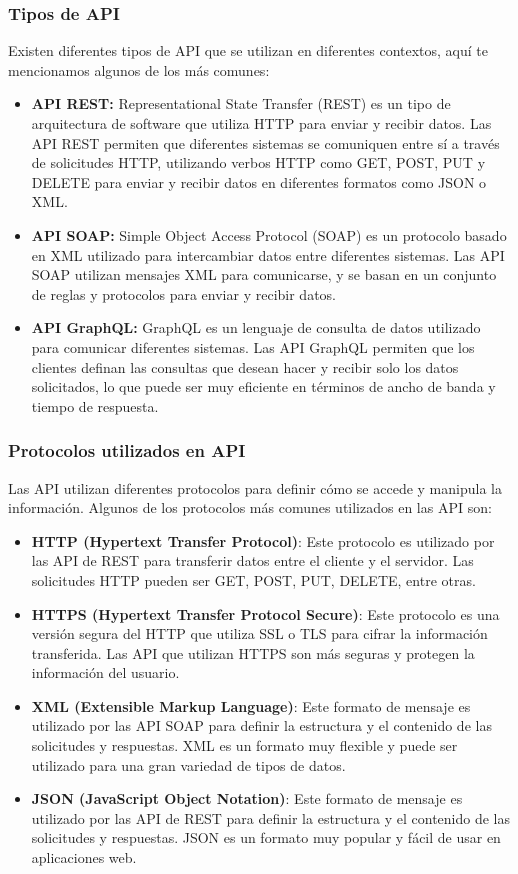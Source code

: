 \documentclass[executivepaper]{article}
\begin{document}
\subsubsection{Tipos de API} 
Existen diferentes tipos de API que se utilizan en diferentes contextos, aquí te mencionamos algunos de los más comunes:
\begin{itemize}
    \item \textbf{API REST:} Representational State Transfer (REST) es un tipo de arquitectura de software que utiliza HTTP para enviar y recibir datos. Las API REST permiten que diferentes sistemas se comuniquen entre sí a través de solicitudes HTTP, utilizando verbos HTTP como GET, POST, PUT y DELETE para enviar y recibir datos en diferentes formatos como JSON o XML.
    \item \textbf{API SOAP:} Simple Object Access Protocol (SOAP) es un protocolo basado en XML utilizado para intercambiar datos entre diferentes sistemas. Las API SOAP utilizan mensajes XML para comunicarse, y se basan en un conjunto de reglas y protocolos para enviar y recibir datos.
    \item \textbf{API GraphQL:} GraphQL es un lenguaje de consulta de datos utilizado para comunicar diferentes sistemas. Las API GraphQL permiten que los clientes definan las consultas que desean hacer y recibir solo los datos solicitados, lo que puede ser muy eficiente en términos de ancho de banda y tiempo de respuesta.
\end{itemize}

\subsubsection{Protocolos utilizados en API}
Las API utilizan diferentes protocolos para definir cómo se accede y manipula la información. Algunos de los protocolos más comunes utilizados en las API son:
\begin{itemize}
    \item \textbf{HTTP (Hypertext Transfer Protocol)}: Este protocolo es utilizado por las API de REST para transferir datos entre el cliente y el servidor. Las solicitudes HTTP pueden ser GET, POST, PUT, DELETE, entre otras.
    \item \textbf{HTTPS (Hypertext Transfer Protocol Secure)}: Este protocolo es una versión segura del HTTP que utiliza SSL o TLS para cifrar la información transferida. Las API que utilizan HTTPS son más seguras y protegen la información del usuario.
    \item \textbf{XML (Extensible Markup Language)}: Este formato de mensaje es utilizado por las API SOAP para definir la estructura y el contenido de las solicitudes y respuestas. XML es un formato muy flexible y puede ser utilizado para una gran variedad de tipos de datos.
    \item \textbf{JSON (JavaScript Object Notation)}: Este formato de mensaje es utilizado por las API de REST para definir la estructura y el contenido de las solicitudes y respuestas. JSON es un formato muy popular y fácil de usar en aplicaciones web.
\end{itemize}
\end{document}

